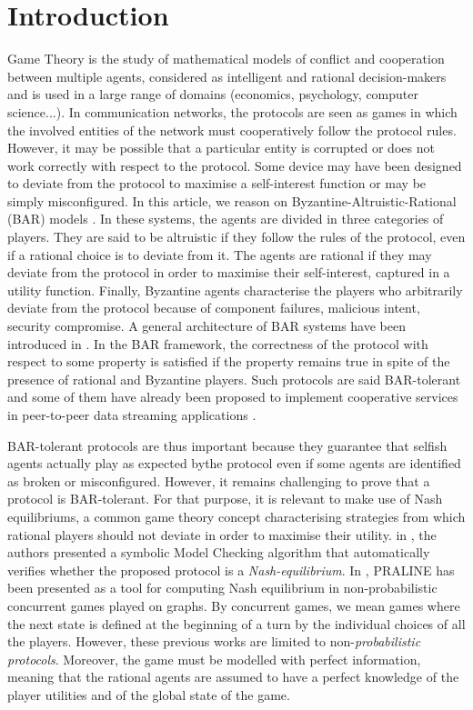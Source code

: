\section{Introduction}
Game Theory is the study of mathematical models of conflict and cooperation between multiple agents, considered as intelligent and rational decision-makers and is used in a large range of domains (economics, psychology, computer science...). In communication networks, the protocols are seen as games in which the involved entities of the network must cooperatively follow the protocol rules. However, it may be possible that a particular entity is corrupted or does not work correctly with respect to the protocol. Some device may have been designed to deviate from the protocol to maximise a self-interest function or may be simply misconfigured. In this article, we reason on Byzantine-Altruistic-Rational (BAR) models \cite{AACDMP05}. In these systems, the agents are divided in three categories of players. They are said to be altruistic if they follow the rules of the protocol, even if a rational choice is to deviate from it. The agents are rational if they may deviate from the protocol in order to maximise their self-interest, captured in a utility function. Finally, Byzantine agents characterise the players who arbitrarily deviate from the protocol because of component failures, malicious intent, security compromise. A general architecture of BAR systems have been introduced in \cite{AACDMP05}. In the BAR framework, the correctness of the protocol with respect to some property is satisfied if the property remains true in spite of the presence of rational and Byzantine players. Such protocols are said BAR-tolerant and some of them have already been proposed to implement cooperative services in peer-to-peer data streaming applications \cite{LCWNRAD06}.

BAR-tolerant protocols are thus important because they guarantee that selfish agents actually play as expected bythe protocol even if some agents are identified as broken or misconfigured. However, it remains challenging to prove that a protocol is BAR-tolerant. For that purpose, it is relevant to make use of Nash equilibriums, a common game theory concept characterising strategies from which rational players should not deviate in order to maximise their utility. in \cite{MMSTACL08}, the authors presented a symbolic Model Checking algorithm that automatically verifies whether the proposed protocol is a \emph{Nash-equilibrium}. In \cite{Brenguier13}, PRALINE has been presented as a tool for computing Nash equilibrium in non-probabilistic concurrent games played on graphs. By concurrent games, we mean games where the next state is defined at the beginning of a turn by the individual choices of all the players. However, these previous works are limited to non-\emph{probabilistic protocols}. Moreover, the game must be modelled with perfect information, meaning that the rational agents are assumed to have a perfect knowledge of the player utilities and of the global state of the game.

